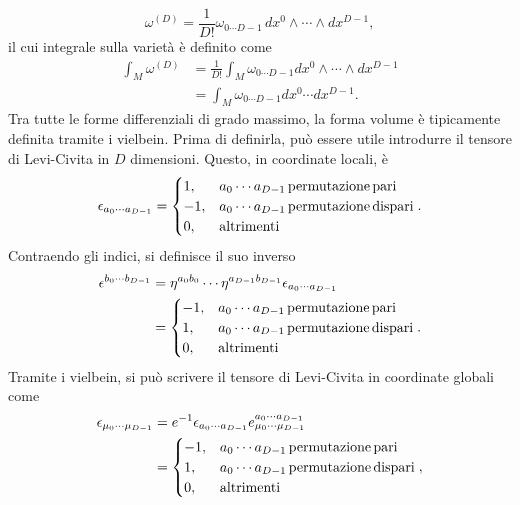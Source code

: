 \begin{equation}
\label{eq: forma differenziale di grado massimo}
    \omega^{(D)} = \frac{1}{D!}\omega_{0\cdots D - 1}\,dx^0\wedge \cdots \wedge dx^{D - 1},
\end{equation}
il cui integrale sulla varietà è definito come
\begin{equation}
    \begin{split}
        \int_M\omega^{(D)} &= \frac{1}{D!}\int_M\omega_{0\cdots D - 1}dx^0 \wedge \cdots \wedge dx^{D - 1} \\
        &= \int_M\omega_{0\cdots D - 1}dx^0 \cdots dx^{D - 1}.
    \end{split}
\end{equation}
Tra tutte le forme differenziali di grado massimo, la forma volume è tipicamente definita tramite i vielbein. Prima di definirla, può essere utile introdurre il tensore di Levi-Civita in $D$ dimensioni. Questo, in coordinate locali, è
\begin{equation}
    \epsilon_{a_0\cdots a_{D-1}} = 
    \begin{cases}
        1, &a_0\cdots a_{D-1}\,\mathrm{permutazione\,pari} \\
        -1, &a_0\cdots a_{D-1}\,\mathrm{permutazione\,dispari} \\
        0, &\mathrm{altrimenti}
    \end{cases}.
\end{equation}
Contraendo gli indici, si definisce il suo inverso
\begin{equation}
    \begin{aligned}
        \epsilon^{b_0\cdots b_{D - 1}} &= \eta^{a_0b_0}\cdots\eta^{a_{D - 1}b_{D - 1}}\epsilon_{a_0\cdots a_{D - 1}} \\
        &= \begin{cases}
            -1, &a_0\cdots a_{D-1}\,\mathrm{permutazione\,pari} \\
            1, &a_0\cdots a_{D-1}\,\mathrm{permutazione\,dispari} \\
            0, &\mathrm{altrimenti}
        \end{cases}.
    \end{aligned}
\end{equation}
Tramite i vielbein, si può scrivere il tensore di Levi-Civita in coordinate globali come
\begin{equation}
    \begin{aligned}
        \epsilon_{\mu_0\cdots \mu_{D - 1}} &= e^{-1}\epsilon_{a_0\cdots a_{D - 1}}e^{a_0\cdots a_{D - 1}}_{\mu_0\cdots \mu_{D - 1}} \\
        &= \begin{cases}
            -1, &a_0\cdots a_{D-1}\,\mathrm{permutazione\,pari} \\
            1, &a_0\cdots a_{D-1}\,\mathrm{permutazione\,dispari} \\
            0, &\mathrm{altrimenti}
        \end{cases},
    \end{aligned}
\end{equation}
